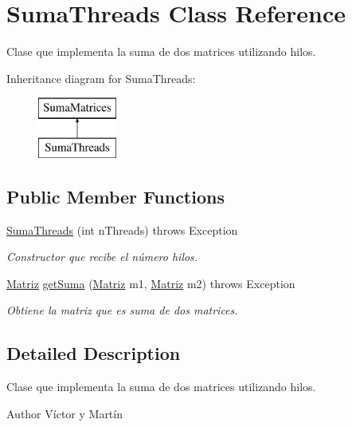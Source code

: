 \hypertarget{classSumaThreads}{\section{Suma\-Threads Class Reference}
\label{classSumaThreads}
}


Clase que implementa la suma de dos matrices utilizando hilos.  


Inheritance diagram for Suma\-Threads\-:\begin{figure}[H]
\begin{center}
\leavevmode
\includegraphics[height=2.000000cm]{classSumaThreads}
\end{center}
\end{figure}
\subsection*{Public Member Functions}
\begin{DoxyCompactItemize}
\item 
\hyperlink{classSumaThreads_a916580477ee278dc5785b878f0be789a}{Suma\-Threads} (int n\-Threads)  throws Exception 
\begin{DoxyCompactList}\small\item\em Constructor que recibe el número hilos. \end{DoxyCompactList}\item 
\hyperlink{classMatriz}{Matriz} \hyperlink{classSumaThreads_ac799c145a2711fff3ac9b348c8afd881}{get\-Suma} (\hyperlink{classMatriz}{Matriz} m1, \hyperlink{classMatriz}{Matriz} m2)  throws Exception 
\begin{DoxyCompactList}\small\item\em Obtiene la matriz que es suma de dos matrices. \end{DoxyCompactList}\end{DoxyCompactItemize}


\subsection{Detailed Description}
Clase que implementa la suma de dos matrices utilizando hilos. 

\begin{DoxyAuthor}{Author}
Víctor y Martín 
\end{DoxyAuthor}


